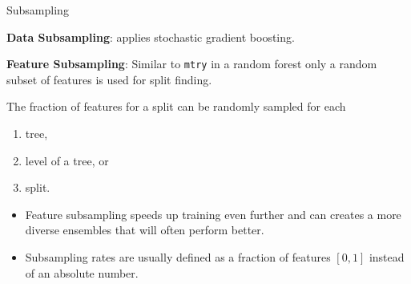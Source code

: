 \begin{vbframe}{Subsampling}

  \textbf{Data Subsampling}:  applies stochastic gradient boosting.

  \lz

  \textbf{Feature Subsampling}: Similar to \texttt{mtry} in a random forest only a random subset of features is used for split finding.

  \lz

  The fraction of features for a split can be randomly sampled for each
  \begin{enumerate}
    \item tree,
    \item level of a tree, or
    \item split.
  \end{enumerate}

  \lz

  \begin{itemize}
    \item Feature subsampling speeds up training even further and can creates a more diverse ensembles that will often perform better.
    \item Subsampling rates are usually defined as a fraction of features $[0,1]$ instead of an absolute number.
  \end{itemize}


\end{vbframe}


